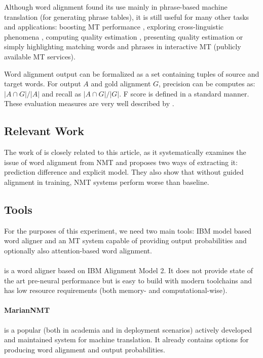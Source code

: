 Although word alignment found its use mainly in phrase-based machine translation (for generating phrase tables), it is still useful for many other tasks and applications: boosting MT performance \citep{alkhouli2016alignment}, exploring cross-linguistic phenomena \citep{schrader2006does}, computing quality estimation \citep{specia2013quest}, presenting quality estimation \citep{zouhar2020extending} or simply highlighting matching words and phrases in interactive MT (publicly available MT services).

Word alignment output can be formalized as a set containing tuples of source and target words. For output $A$ and gold alignment $G$, precision can be computes as: $ |A \cap G| / |A|$ and recall as $|A \cap G| / |G|$. F score is defined in a standard manner. These evaluation measures are very well described by \citet{mihalcea2003evaluation}.

\subsection{Relevant Work}

The work of \citet{li2019word} is closely related to this article, as it systematically examines the issue of word alignment from NMT and proposes two ways of extracting it: prediction difference and explicit model. They also show that without guided alignment in training, NMT systems perform worse than \fastalign{} baseline.

\subsection{Tools}

For the purposes of this experiment, we need two main tools: IBM model based word aligner and an MT system capable of providing output probabilities and optionally also attention-based word alignment.

\paragraph{\fastalign} \citep{dyer2013simple} is a word aligner based on IBM Alignment Model 2. It does not provide state of the art pre-neural performance but is easy to build with modern toolchains and has low resource requirements (both memory- and computational-wise).

\paragraph{MarianNMT} \citep{junczys2018marian} is a popular (both in academia and in deployment scenarios) actively developed and maintained system for machine translation. It already contains options for producing word alignment and output probabilities.

